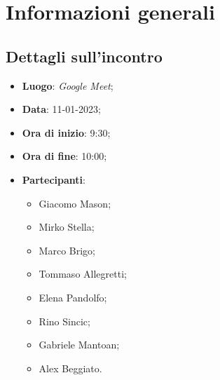 \section{Informazioni generali}

\subsection{Dettagli sull'incontro}
\begin{itemize}
\item \textbf{Luogo}: \textit{Google Meet};
\item \textbf{Data}: 11-01-2023;
\item \textbf{Ora di inizio}: 9:30;
\item \textbf{Ora di fine}: 10:00;
\item \textbf{Partecipanti}: 
\begin{itemize}
	\item Giacomo Mason;
	\item Mirko Stella;
	\item Marco Brigo;
	\item Tommaso Allegretti;
	\item Elena Pandolfo;
	\item Rino Sincic;
	\item Gabriele Mantoan;
	\item Alex Beggiato.
\end{itemize}
\end{itemize}

